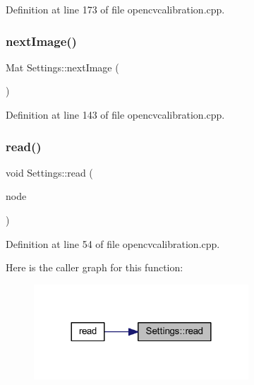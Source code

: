 Definition at line 173 of file opencvcalibration.\+cpp.

\mbox{\label{class_settings_a7701462e928f2425b342440fba9973e5}} 
\subsubsection{\texorpdfstring{nextImage()}{nextImage()}}
{\footnotesize\ttfamily Mat Settings\+::next\+Image (\begin{DoxyParamCaption}{ }\end{DoxyParamCaption})\hspace{0.3cm}{\ttfamily [inline]}}



Definition at line 143 of file opencvcalibration.\+cpp.

\mbox{\label{class_settings_a2d7841f8441095032e0f3b7d20adfd3f}} 
\subsubsection{\texorpdfstring{read()}{read()}}
{\footnotesize\ttfamily void Settings\+::read (\begin{DoxyParamCaption}\item[{const File\+Node \&}]{node }\end{DoxyParamCaption})\hspace{0.3cm}{\ttfamily [inline]}}



Definition at line 54 of file opencvcalibration.\+cpp.

Here is the caller graph for this function\+:
\nopagebreak
\begin{figure}[H]
\begin{center}
\leavevmode
\includegraphics[width=228pt]{class_settings_a2d7841f8441095032e0f3b7d20adfd3f_icgraph}
\end{center}
\end{figure}
\mbox{\label{class_settings_ae57696cead99c4f0c528e33793866457}} 
